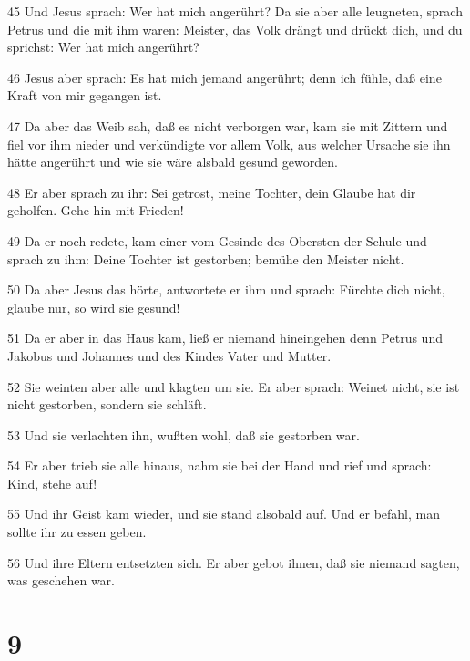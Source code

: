 \par 45 Und Jesus sprach: Wer hat mich angerührt? Da sie aber alle leugneten, sprach Petrus und die mit ihm waren: Meister, das Volk drängt und drückt dich, und du sprichst: Wer hat mich angerührt?
\par 46 Jesus aber sprach: Es hat mich jemand angerührt; denn ich fühle, daß eine Kraft von mir gegangen ist.
\par 47 Da aber das Weib sah, daß es nicht verborgen war, kam sie mit Zittern und fiel vor ihm nieder und verkündigte vor allem Volk, aus welcher Ursache sie ihn hätte angerührt und wie sie wäre alsbald gesund geworden.
\par 48 Er aber sprach zu ihr: Sei getrost, meine Tochter, dein Glaube hat dir geholfen. Gehe hin mit Frieden!
\par 49 Da er noch redete, kam einer vom Gesinde des Obersten der Schule und sprach zu ihm: Deine Tochter ist gestorben; bemühe den Meister nicht.
\par 50 Da aber Jesus das hörte, antwortete er ihm und sprach: Fürchte dich nicht, glaube nur, so wird sie gesund!
\par 51 Da er aber in das Haus kam, ließ er niemand hineingehen denn Petrus und Jakobus und Johannes und des Kindes Vater und Mutter.
\par 52 Sie weinten aber alle und klagten um sie. Er aber sprach: Weinet nicht, sie ist nicht gestorben, sondern sie schläft.
\par 53 Und sie verlachten ihn, wußten wohl, daß sie gestorben war.
\par 54 Er aber trieb sie alle hinaus, nahm sie bei der Hand und rief und sprach: Kind, stehe auf!
\par 55 Und ihr Geist kam wieder, und sie stand alsobald auf. Und er befahl, man sollte ihr zu essen geben.
\par 56 Und ihre Eltern entsetzten sich. Er aber gebot ihnen, daß sie niemand sagten, was geschehen war.

\chapter{9}

